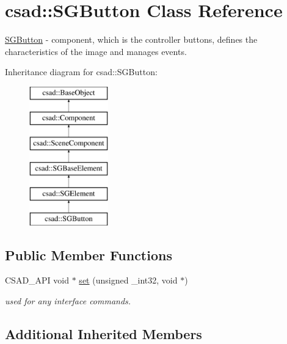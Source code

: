 \hypertarget{classcsad_1_1_s_g_button}{\section{csad\-:\-:S\-G\-Button Class Reference}
\label{classcsad_1_1_s_g_button}
}


\hyperlink{classcsad_1_1_s_g_button}{S\-G\-Button} -\/ component, which is the controller buttons, defines the characteristics of the image and manages events.  


Inheritance diagram for csad\-:\-:S\-G\-Button\-:\begin{figure}[H]
\begin{center}
\leavevmode
\includegraphics[height=6.000000cm]{classcsad_1_1_s_g_button}
\end{center}
\end{figure}
\subsection*{Public Member Functions}
\begin{DoxyCompactItemize}
\item 
\hypertarget{classcsad_1_1_s_g_button_a7b51182ae7fbbd76e887cf6fed241f83}{C\-S\-A\-D\-\_\-\-A\-P\-I void $\ast$ \hyperlink{classcsad_1_1_s_g_button_a7b51182ae7fbbd76e887cf6fed241f83}{set} (unsigned \-\_\-int32, void $\ast$)}\label{classcsad_1_1_s_g_button_a7b51182ae7fbbd76e887cf6fed241f83}

\begin{DoxyCompactList}\small\item\em used for any interface commands. \end{DoxyCompactList}\end{DoxyCompactItemize}
\subsection*{Additional Inherited Members}



